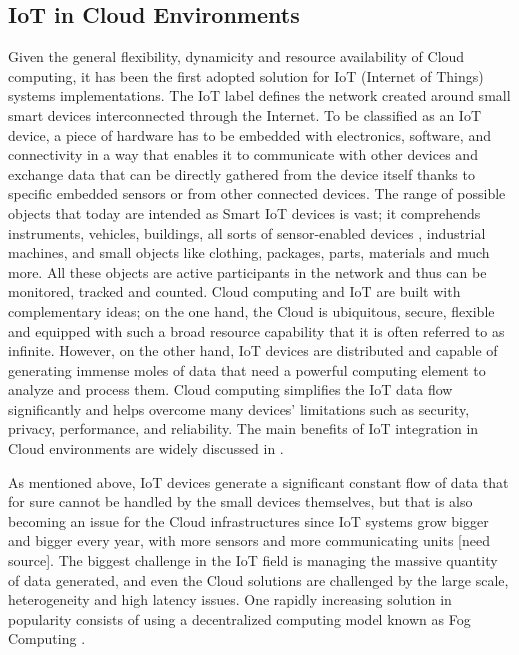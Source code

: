 \subsection{IoT in Cloud Environments}
Given the general flexibility, dynamicity and resource availability of Cloud computing, it has been the first adopted solution for IoT (Internet of Things) systems implementations.
The IoT label defines the network created around small smart devices interconnected through the Internet. To be classified as an IoT device, a piece of hardware has to be embedded with electronics, software, and connectivity in a way that enables it to communicate with other devices and exchange data that can be directly gathered from the device itself thanks to specific embedded sensors or from other connected devices.
The range of possible objects that today are intended as Smart IoT devices is vast; it comprehends instruments, vehicles, buildings, all sorts of sensor-enabled devices \cite{gokhale2018introduction}, industrial machines, and small objects like clothing, packages, parts, materials and much more. All these objects are active participants in the network and thus can be monitored, tracked and counted.
Cloud computing and IoT are built with complementary ideas; on the one hand, the Cloud is ubiquitous, secure, flexible and equipped with such a broad resource capability that it is often referred to as infinite. However, on the other hand, IoT devices are distributed and capable of generating immense moles of data that need a powerful computing element to analyze and process them.
Cloud computing simplifies the IoT data flow significantly and helps overcome many devices' limitations such as security, privacy, performance, and reliability. The main benefits of IoT integration in Cloud environments are widely discussed in \cite{atlam2017integration}.

As mentioned above, IoT devices generate a significant constant flow of data that for sure cannot be handled by the small devices themselves, but that is also becoming an issue for the Cloud infrastructures since IoT systems grow bigger and bigger every year, with more sensors and more communicating units [need source].
The biggest challenge in the IoT field is managing the massive quantity of data generated, and even the Cloud solutions are challenged by the large scale, heterogeneity and high latency issues. One rapidly increasing solution in popularity consists of using a decentralized computing model known as Fog Computing \cite{iorga2018fog}.

